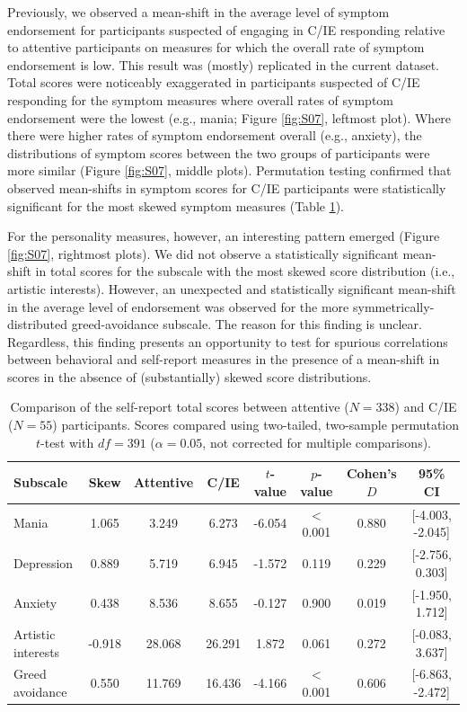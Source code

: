 \documentclass[a4paper,notitlepage,12pt]{article}
\begin{document}
Previously, we observed a mean-shift in the average level of symptom endorsement for participants suspected of engaging in C/IE responding relative to attentive participants on measures for which the overall rate of symptom endorsement is low. This result was (mostly) replicated in the current dataset. Total scores were noticeably exaggerated in participants suspected of C/IE responding for the symptom measures where overall rates of symptom endorsement were the lowest (e.g., mania; Figure \ref{fig:S07}, leftmost plot). Where there were higher rates of symptom endorsement overall (e.g., anxiety), the distributions of symptom scores between the two groups of participants were more similar (Figure \ref{fig:S07}, middle plots). Permutation testing confirmed that observed mean-shifts in symptom scores for C/IE participants were statistically significant for the most skewed symptom measures (Table \ref{tab:S11}).

For the personality measures, however, an interesting pattern emerged (Figure \ref{fig:S07}, rightmost plots). We did not observe a statistically significant mean-shift in total scores for the subscale with the most skewed score distribution (i.e., artistic interests). However, an unexpected and statistically significant mean-shift in the average level of endorsement was observed for the more symmetrically-distributed greed-avoidance subscale. The reason for this finding is unclear. Regardless, this finding presents an opportunity to test for spurious correlations between behavioral and self-report measures in the presence of a mean-shift in scores in the absence of (substantially) skewed score distributions. 

\begin{table}[!t]
    \centering
    \small
    \begin{tabular}{lccccccc}
        \toprule
        Subscale & Skew &  Attentive & C/IE & $t$-value & $p$-value & Cohen's $D$ & 95\% CI \\
        \midrule
        Mania                &  1.065 &      3.249 &   6.273 & -6.054 &  $<$0.001 &  0.880 &  [-4.003, -2.045] \\
        Depression           &  0.889 &      5.719 &   6.945 & -1.572 &  0.119 &  0.229 &   [-2.756, 0.303] \\
        Anxiety              &  0.438 &      8.536 &   8.655 & -0.127 &  0.900 &  0.019 &   [-1.950, 1.712] \\
        Artistic interests   & -0.918 &     28.068 &  26.291 &  1.872 &  0.061 &  0.272 &   [-0.083, 3.637] \\
        Greed avoidance      &  0.550 &     11.769 &  16.436 & -4.166 &  $<$0.001 &  0.606 &  [-6.863, -2.472] \\
        \bottomrule
    \end{tabular}
    \caption{Comparison of the self-report total scores between attentive ($N=338$) and C/IE ($N=55$) participants. Scores compared using two-tailed, two-sample permutation $t$-test with $df=391$ ($\alpha = 0.05$, not corrected for multiple comparisons).}    
    \label{tab:S11}
\end{table}
\end{document}
